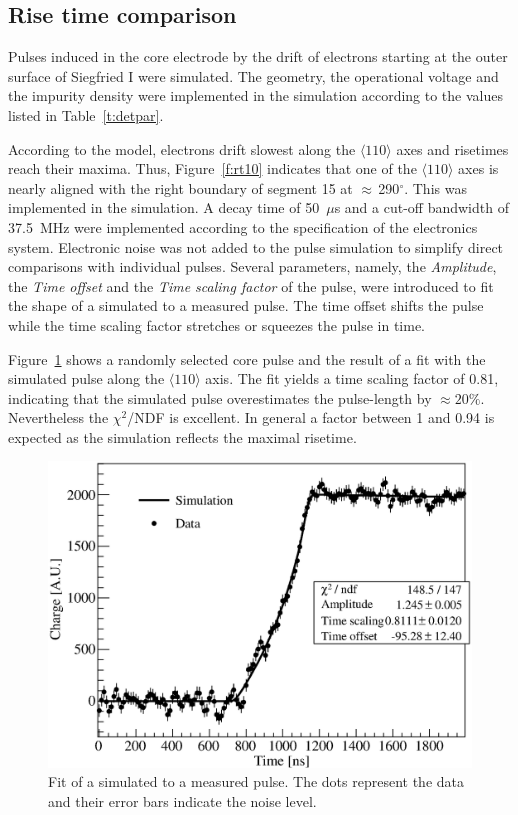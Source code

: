 \documentclass[epj]{svjour}
\begin{document}
\subsection{Rise time comparison}
\label{s:lon}
Pulses induced in the core electrode by the drift of electrons
starting at the outer surface of Siegfried I were simulated. The
geometry, the operational voltage and the impurity density were
implemented in the simulation according to the values listed in
Table~\ref{t:detpar}.

According to the model, electrons drift slowest along the $\langle 110
\rangle$ axes and risetimes reach their maxima. Thus,
Figure~\ref{f:rt10} indicates that one of the $\langle 110 \rangle$
axes is nearly aligned with the right boundary of segment 15 at
$\approx$\,290$^\circ$. This was implemented in the simulation. A
decay time of 50~$\mu$s and a cut-off bandwidth of 37.5~MHz were
implemented according to the specification of the electronics
system. Electronic noise was not added to the pulse simulation to
simplify direct comparisons with individual pulses. Several
parameters, namely, the \emph{Amplitude}, the \emph{Time offset} and
the \emph{Time scaling factor} of the pulse, were introduced to fit
the shape of a simulated to a measured pulse. The time offset shifts
the pulse while the time scaling factor stretches or squeezes the
pulse in time.

Figure~\ref{f:s2d} shows a randomly selected core pulse and the result
of a fit with the simulated pulse along the $\langle 110 \rangle$
axis. The fit yields a time scaling factor of 0.81, indicating that
the simulated pulse overestimates the pulse-length by $\approx
20\%$. Nevertheless the $\chi^{2}$/NDF is excellent. In general a
factor between 1 and 0.94 is expected as the simulation reflects the
maximal risetime.
\begin{figure}
\includegraphics[width=\linewidth]{PSs2d}
\caption{Fit of a simulated to a measured pulse. The dots represent
the data and their error bars indicate the noise level.}
\label{f:s2d}
\end{figure}
\end{document}
